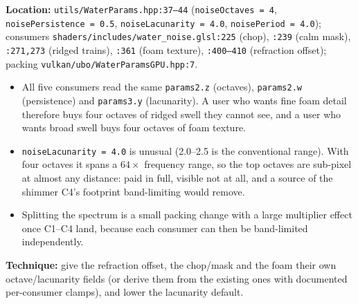 \documentclass[11pt,a4paper]{article}
\begin{document}
\textbf{Location:} \texttt{utils/WaterParams.hpp:37--44} (\texttt{noiseOctaves = 4},
\texttt{noisePersistence = 0.5}, \texttt{noiseLacunarity = 4.0}, \texttt{noisePeriod = 4.0}); consumers
\texttt{shaders/includes/water\_noise.glsl:225} (chop), \texttt{:239} (calm mask), \texttt{:271,273} (ridged trains),
\texttt{:361} (foam texture), \texttt{:400--410} (refraction offset); packing
\texttt{vulkan/ubo/WaterParamsGPU.hpp:7}.

\begin{itemize}
    \item All five consumers read the same \texttt{params2.z} (octaves), \texttt{params2.w} (persistence) and
    \texttt{params3.y} (lacunarity). A user who wants fine foam detail therefore buys four octaves of ridged swell they
    cannot see, and a user who wants broad swell buys four octaves of foam texture.
    \item \texttt{noiseLacunarity = 4.0} is unusual (2.0--2.5 is the conventional range). With four octaves it spans a
    $64\times$ frequency range, so the top octaves are sub-pixel at almost any distance: paid in full, visible not at
    all, and a source of the shimmer C4's footprint band-limiting would remove.
    \item Splitting the spectrum is a small packing change with a large multiplier effect once C1--C4 land, because each
    consumer can then be band-limited independently.
\end{itemize}

\textbf{Technique:} give the refraction offset, the chop/mask and the foam their own octave/lacunarity fields (or derive
them from the existing ones with documented per-consumer clamps), and lower the lacunarity default.
\end{document}
